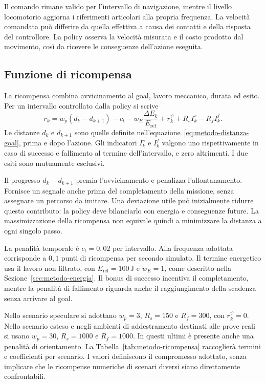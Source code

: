 Il comando rimane valido per l'intervallo di navigazione, mentre il livello locomotorio aggiorna i riferimenti articolari alla propria frequenza. La velocità comandata può differire da quella effettiva a causa dei contatti e della risposta del controllore. La policy osserva la velocità misurata e il costo prodotto dal movimento, così da ricevere le conseguenze dell'azione eseguita.

\subsection{Funzione di ricompensa}

La ricompensa combina avvicinamento al goal, lavoro meccanico, durata ed esito. Per un intervallo controllato dalla policy si scrive
\begin{equation}
    r_k=w_p(d_k-d_{k+1})-c_t
        -w_E\frac{\Delta E_k}{E_{\mathrm{ref}}}
        +r_k^{\psi}+R_s I_k^s-R_f I_k^f.
    \label{eq:metodo-ricompensa-completa}
\end{equation}
Le distanze $d_k$ e $d_{k+1}$ sono quelle definite nell'equazione~\eqref{eq:metodo-distanza-goal}, prima e dopo l'azione. Gli indicatori $I_k^s$ e $I_k^f$ valgono uno rispettivamente in caso di successo e fallimento al termine dell'intervallo, e zero altrimenti. I due esiti sono mutuamente esclusivi.

Il progresso $d_k-d_{k+1}$ premia l'avvicinamento e penalizza l'allontanamento. Fornisce un segnale anche prima del completamento della missione, senza assegnare un percorso da imitare. Una deviazione utile può inizialmente ridurre questo contributo: la policy deve bilanciarlo con energia e conseguenze future. La massimizzazione della ricompensa non equivale quindi a minimizzare la distanza a ogni singolo passo.

La penalità temporale è $c_t=0{,}02$ per intervallo. Alla frequenza adottata corrisponde a $0{,}1$ punti di ricompensa per secondo simulato. Il termine energetico usa il lavoro non filtrato, con $E_{\mathrm{ref}}=100\,\mathrm{J}$ e $w_E=1$, come descritto nella Sezione~\ref{sec:metodo-energia}. Il bonus di successo incentiva il completamento, mentre la penalità di fallimento riguarda anche il raggiungimento della scadenza senza arrivare al goal.

Nello scenario speculare si adottano $w_p=3$, $R_s=150$ e $R_f=300$, con $r_k^{\psi}=0$. Nello scenario esteso e negli ambienti di addestramento destinati alle prove reali si usano $w_p=30$, $R_s=1000$ e $R_f=1000$. In questi ultimi è presente anche una penalità di orientamento. La Tabella~\ref{tab:metodo-ricompensa} raccoglierà termini e coefficienti per scenario. I valori definiscono il compromesso adottato, senza implicare che le ricompense numeriche di scenari diversi siano direttamente confrontabili.

